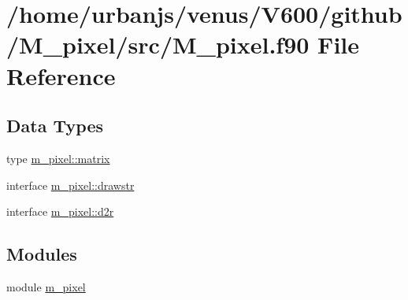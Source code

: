 \hypertarget{M__pixel_8f90}{}\section{/home/urbanjs/venus/\+V600/github/\+M\+\_\+pixel/src/\+M\+\_\+pixel.f90 File Reference}
\label{M__pixel_8f90}
\subsection*{Data Types}
\begin{DoxyCompactItemize}
\item 
type \mbox{\hyperlink{structm__pixel_1_1matrix}{m\+\_\+pixel\+::matrix}}
\item 
interface \mbox{\hyperlink{interfacem__pixel_1_1drawstr}{m\+\_\+pixel\+::drawstr}}
\item 
interface \mbox{\hyperlink{interfacem__pixel_1_1d2r}{m\+\_\+pixel\+::d2r}}
\end{DoxyCompactItemize}
\subsection*{Modules}
\begin{DoxyCompactItemize}
\item 
module \mbox{\hyperlink{namespacem__pixel}{m\+\_\+pixel}}
\end{DoxyCompactItemize}
